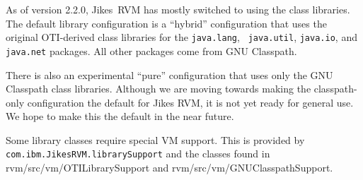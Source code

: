 As of version 2.2.0, Jikes\JikesTMFootnote\ RVM has mostly switched to
using the  class libraries.  The
default library configuration is a ``hybrid'' configuration that uses
the original OTI-derived class libraries for the {\tt java.lang}, {\tt
java.util}, {\tt java.io}, and {\tt java.net} packages.  All other
packages come from GNU Classpath. 

There is also an experimental ``pure'' configuration that uses only
the GNU Classpath class libraries. Although we are moving towards
making the classpath-only configuration the default for Jikes RVM, it
is not yet ready for general use. We hope to make this the default in
the near future.

Some library classes require special VM support.  This is provided by
{\tt com.ibm.JikesRVM.librarySupport} and the classes found in
rvm/src/vm/OTILibrarySupport and rvm/src/vm/GNUClasspathSupport. 

\JikesTMFooter
